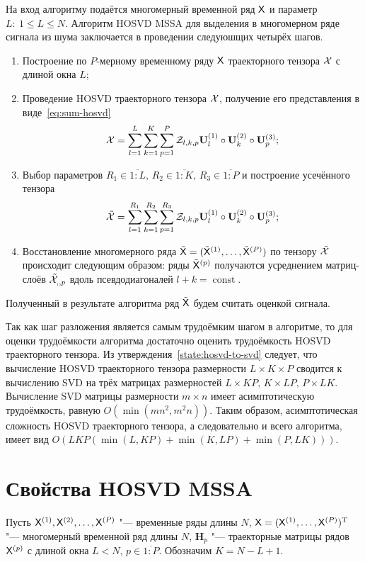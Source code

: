 \documentclass[specialist,
    substylefile = spbu_report.rtx,
    subf,href,colorlinks=true, 12pt]{disser}
\theoremstyle{plain}
\theoremstyle{definition}
\theoremstyle{remark}
\begin{document}
    На вход алгоритму подаётся многомерный временной ряд $\mathsf{X}$ и параметр $L:\: {1\leqslant L\leqslant N}$.
    Алгоритм HOSVD MSSA для выделения в многомерном ряде сигнала из шума заключается в проведении следуюшщих
    четырёх шагов.
    \begin{enumerate}
        \item Построение по $P$-мерному временному ряду $\mathsf{X}$ траекторного тензора $\mathcal{X}$ с длиной окна $L$;
        \item Проведение HOSVD траекторного тензора $\mathcal{X}$, получение его представления в виде~\eqref{eq:sum-hosvd}
        \begin{equation}
            \mathcal{X} = \sum_{l=1}^{L} \sum_{k=1}^{K} \sum_{p=1}^{P} \mathcal{Z}_{l,k,p} \mathbf{U}_l^{(1)}\circ \mathbf{U}_k^{(2)} \circ \mathbf{U}_p^{(3)};
            \label{eq:hosvd-mssa}
        \end{equation}
        \item Выбор параметров $R_1 \in \overline{1:L},\, R_2\in \overline{1:K},\, R_3\in \overline{1:P}$ и
        построение усечённого тензора
        \[
            \tilde{\mathcal{X}}=\sum_{l=1}^{R_1} \sum_{k=1}^{R_2} \sum_{p=1}^{R_3} \mathcal{Z}_{l,k,p} \mathbf{U}_l^{(1)}\circ \mathbf{U}_k^{(2)} \circ \mathbf{U}_p^{(3)};
        \]
        \item Восстановление многомерного ряда $\tilde{\mathsf{X}}=(\tilde{\mathsf{X}}^{(1)}, \ldots, \tilde{\mathsf{X}}^{(P)})$ по тензору
        $\tilde{\mathcal{X}}$ происходит следующим образом:
        ряды $\tilde{\mathsf{X}}^{(p)}$ получаются усреднением матриц-слоёв $\tilde{\mathcal{X}}_{,,p}$ вдоль
        псевдодиагоналей $l+k=\operatorname{const}$.
    \end{enumerate}
    Полученный в результате алгоритма ряд $\tilde{\mathsf{X}}$ будем считать оценкой сигнала.

    Так как шаг разложения является самым трудоёмким шагом в алгоритме, то для оценки трудоёмкости алгоритма
    достаточно оценить трудоёмкость HOSVD траекторного тензора.
    Из утверждения~\ref{state:hosvd-to-svd} следует, что вычисление HOSVD траекторного тензора размерности ${L\times K \times P}$
    сводится к вычислению SVD на трёх матрицах размерностей $L\times KP,\, K\times LP,\, P\times LK$.
    Вычисление SVD матрицы размерности $m\times n$ имеет асимптотическую трудоёмкость, равную $O(\min(mn^2, m^2 n)).$
    Таким образом, асимптотическая сложность HOSVD траекторного тензора, а следовательно и всего алгоритма, имеет вид
    $O\left(LKP(\min(L, KP) + \min(K, LP) + \min(P, LK))\right)$.


    \section{Свойства HOSVD MSSA}\label{sec:hosvd-mssa-properties}
    Пусть $\mathsf{X}^{(1)}, \mathsf{X}^{(2)}, \ldots, \mathsf{X}^{(P)}$ "--- временные ряды длины $N$,
    $\mathsf{X} = (\mathsf{X}^{(1)},\ldots, \mathsf{X}^{(P)})^{\mathrm{T}}$ "--- многомерный временной ряд длины $N$,
    $\mathbf{H}_p$ "--- траекторные матрицы рядов $\mathsf{X}^{(p)}$ с длиной окна $L < N$, $p\in \overline{1:P}$.
    Обозначим $K = N - L + 1$.
\end{document}
